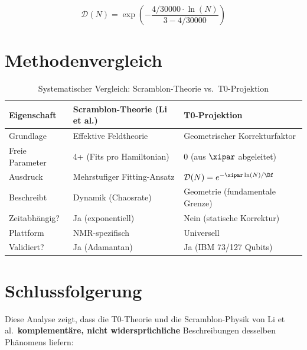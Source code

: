 \begin{equation}
	\mathcal{D}(N) = \exp\left(-\frac{4/30000 \cdot \ln(N)}{3 - 4/30000}\right)
\end{equation}


\section{Methodenvergleich}
\label{sec:methods}

\begin{table}[h]
	\centering
	\caption{Systematischer Vergleich: Scramblon-Theorie vs.\ T0-Projektion}
	\label{tab:method_comparison}
	\begin{tabular}{@{}lll@{}}
		\toprule
		Eigenschaft & Scramblon-Theorie (Li et al.) & T0-Projektion \\
		\midrule
		Grundlage & Effektive Feldtheorie & Geometrischer Korrekturfaktor \\
		Freie Parameter & 4+ (Fits pro Hamiltonian) & 0 (aus $\xipar$ abgeleitet) \\
		Ausdruck & Mehrstufiger Fitting-Ansatz & $\mathcal{D}(N) = e^{-\xipar \ln(N)/\Df}$ \\
		Beschreibt & Dynamik (Chaosrate) & Geometrie (fundamentale Grenze) \\
		Zeitabhängig? & Ja (exponentiell) & Nein (statische Korrektur) \\
		Plattform & NMR-spezifisch & Universell \\
		Validiert? & Ja (Adamantan) & Ja (IBM 73/127 Qubits) \\
		\bottomrule
	\end{tabular}
\end{table}


\section{Schlussfolgerung}
\label{sec:conclusion}

Diese Analyse zeigt, dass die T0-Theorie und die Scramblon-Physik von Li et al.\ \textbf{komplementäre, nicht widersprüchliche} Beschreibungen desselben Phänomens liefern:

